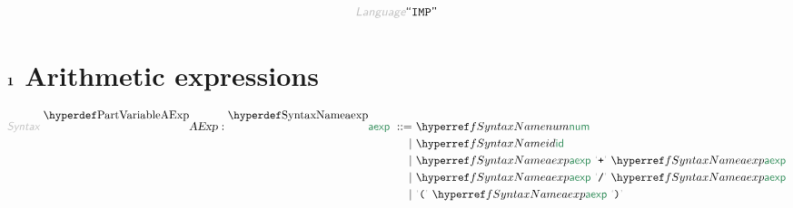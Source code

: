 \begin{displaymath}
\KEY{Language} \STRING{IMP}
\end{displaymath}

\section*{$\SECT{1}$ Arithmetic expressions}\hypertarget{sect1-arithmetic-expressions}{}\label{sect1-arithmetic-expressions}

\begin{align*}
  \KEY{Syntax} ~ 
    \VARDECL{AExp} : \SYNDECL{aexp}
      ~ ::= ~ &
      \SYNREF{num} \\
      ~ \mid ~ &  \SYNREF{id} \\
      ~ \mid ~ &  \SYNREF{aexp} ~ \LEX{+{}} ~ \SYNREF{aexp} \\
      ~ \mid ~ &  \SYNREF{aexp} ~ \LEX{/{}} ~ \SYNREF{aexp} \\
      ~ \mid ~ &  \LEX{(} ~ \SYNREF{aexp} ~ \LEX{)}
\end{align*}
